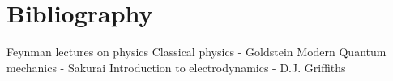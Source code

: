 \chapter{Bibliography}

Feynman lectures on physics
Classical physics - Goldstein
Modern Quantum mechanics - Sakurai
Introduction to electrodynamics - D.J. Griffiths


